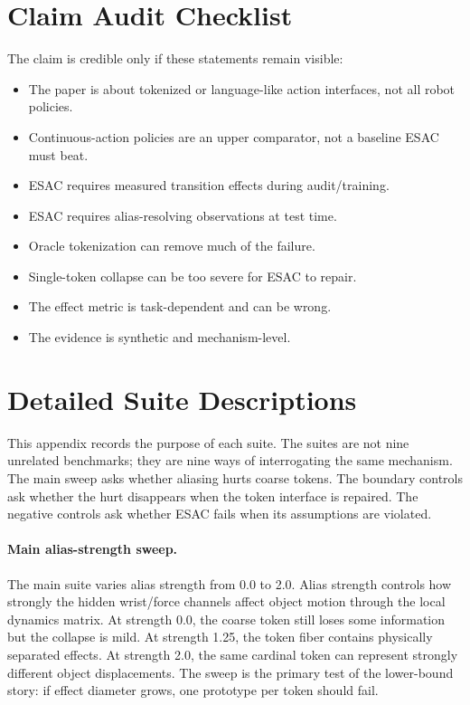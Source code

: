 \documentclass{article}
\begin{document}
\section{Claim Audit Checklist}

The claim is credible only if these statements remain visible:

\begin{itemize}[leftmargin=1.4em]
    \item The paper is about tokenized or language-like action interfaces, not
    all robot policies.
    \item Continuous-action policies are an upper comparator, not a baseline
    ESAC must beat.
    \item ESAC requires measured transition effects during audit/training.
    \item ESAC requires alias-resolving observations at test time.
    \item Oracle tokenization can remove much of the failure.
    \item Single-token collapse can be too severe for ESAC to repair.
    \item The effect metric is task-dependent and can be wrong.
    \item The evidence is synthetic and mechanism-level.
\end{itemize}

\section{Detailed Suite Descriptions}

This appendix records the purpose of each suite. The suites are not nine
unrelated benchmarks; they are nine ways of interrogating the same mechanism.
The main sweep asks whether aliasing hurts coarse tokens. The boundary controls
ask whether the hurt disappears when the token interface is repaired. The
negative controls ask whether ESAC fails when its assumptions are violated.

\paragraph{Main alias-strength sweep.}
The main suite varies alias strength from 0.0 to 2.0. Alias strength controls
how strongly the hidden wrist/force channels affect object motion through the
local dynamics matrix. At strength 0.0, the coarse token still loses some
information but the collapse is mild. At strength 1.25, the token fiber contains
physically separated effects. At strength 2.0, the same cardinal token can
represent strongly different object displacements. The sweep is the primary
test of the lower-bound story: if effect diameter grows, one prototype per
token should fail.
\end{document}
